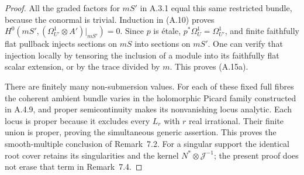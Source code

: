 \begin{proof}
All the graded factors for $mS'$ in A.3.1 equal this same restricted bundle, because the conormal is trivial. Induction in (A.10) proves $H^0(mS',(\Omega_{U'}^1\otimes A')|_{mS'})=0$. Since $p$ is étale, $p^*\Omega_U^1=\Omega_{U'}^1$, and finite faithfully flat pullback injects sections on $mS$ into sections on $mS'$. One can verify that injection locally by tensoring the inclusion of a module into its faithfully flat scalar extension, or by the trace divided by $m$. This proves (A.15a).

There are finitely many non-submersion values. For each of these fixed full fibres the coherent ambient bundle varies in the holomorphic Picard family constructed in A.4.9, and proper semicontinuity makes its nonvanishing locus analytic. Each locus is proper because it excludes every $L_r$ with $r$ real irrational. Their finite union is proper, proving the simultaneous generic assertion. This proves the smooth-multiple conclusion of Remark~7.2. For a singular support the identical root cover retains its singularities and the kernel $N^*\otimes\mathcal J^{-1}$; the present proof does not erase that term in Remark~7.4.
\end{proof}

